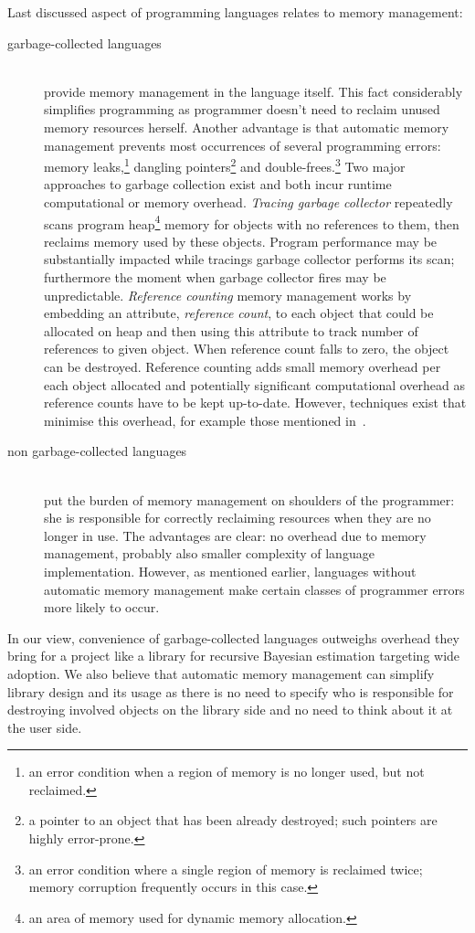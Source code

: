 Last discussed aspect of programming languages relates to memory management:
\begin{description}
	\item[garbage-collected languages] \hfill \\
		provide memory management in the language itself. This fact considerably simplifies
		programming as programmer doesn't need to reclaim unused memory resources herself. Another advantage
		is that automatic memory management prevents most occurrences of several programming errors:
		memory leaks,\footnote{an error condition when a region of memory is no longer used, but not
		reclaimed.} dangling pointers\footnote{a pointer to an object that has been already destroyed;
		such pointers are highly error-prone.} and double-frees.\footnote{an error condition where a
		single region of memory is reclaimed twice; memory corruption frequently occurs in this
		case.} Two major
		approaches to garbage collection exist and both incur runtime computational or memory
		overhead. \emph{Tracing garbage collector} repeatedly scans program heap\footnote{an area of
		memory used for dynamic memory allocation.} memory for objects
		with no references to them, then reclaims memory used by these objects. Program performance
		may be substantially impacted while tracings garbage collector performs its scan; furthermore
		the moment when garbage collector fires may be unpredictable. \emph{Reference counting}
		memory management works by embedding an attribute, \emph{reference count}, to each object
		that could be allocated on heap and then using this attribute to track number of references
		to given object. When reference count falls to zero, the object can be destroyed. Reference
		counting adds small memory overhead per each object allocated and potentially significant
		computational overhead as reference counts have to be kept up-to-date. However, techniques
		exist that minimise this overhead, for example those mentioned in~\cite{LevPet:06}.
	\item[non garbage-collected languages] \hfill \\
		put the burden of memory management on shoulders of the programmer: she is responsible for
		correctly reclaiming resources when they are no longer in use. The advantages are clear:
		no overhead due to memory management, probably also smaller complexity of language
		implementation. However, as mentioned earlier, languages without automatic memory management
		make certain classes of programmer errors more likely to occur.
\end{description}
In our view, convenience of garbage-collected languages outweighs overhead they bring for a project
like a library for recursive Bayesian estimation targeting wide adoption. We also believe that automatic
memory management can simplify library design and its usage as there is no need to specify who is
responsible for destroying involved objects on the library side and no need to think about it at
the user side.

